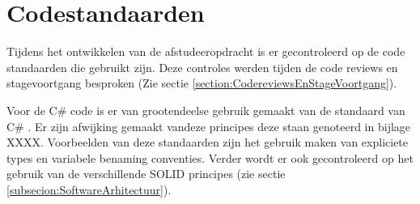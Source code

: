 \section{Codestandaarden}
Tijdens het ontwikkelen van de afstudeeropdracht is er gecontroleerd op de code standaarden die gebruikt zijn.
Deze controles werden tijden de code reviews en stagevoortgang besproken (Zie sectie \ref{section:CodereviewsEnStageVoortgang}).

\whitespace
Voor de C\# code is er van grootendeelse gebruik gemaakt van de standaard  van C\# \parencite{CodestandaardCSharp}.  
Er zijn afwijking gemaakt vandeze principes deze staan genoteerd in bijlage XXXX.
Voorbeelden van deze standaarden zijn het gebruik maken van expliciete types en variabele benaming conventies.
Verder wordt er ook gecontroleerd op het gebruik van de verschillende SOLID principes (zie sectie \ref{subsecion:SoftwareArhitectuur}).
%
%
%
